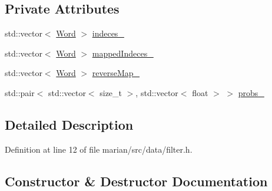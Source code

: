\subsection*{Private Attributes}
\begin{DoxyCompactItemize}
\item 
std\+::vector$<$ \hyperlink{namespacemarian_a5db8bee455c97a62d6a525dc48efe4c2}{Word} $>$ \hyperlink{classmarian_1_1FilterInfo_aa1adbd7e9344e1183b61db98c368ee66}{indeces\+\_\+}
\item 
std\+::vector$<$ \hyperlink{namespacemarian_a5db8bee455c97a62d6a525dc48efe4c2}{Word} $>$ \hyperlink{classmarian_1_1FilterInfo_a231ddfb90ed57402c6f20fa4e8eb3afd}{mapped\+Indeces\+\_\+}
\item 
std\+::vector$<$ \hyperlink{namespacemarian_a5db8bee455c97a62d6a525dc48efe4c2}{Word} $>$ \hyperlink{classmarian_1_1FilterInfo_a18e06a5f0cb4ae6ab7e1505a47c6f4a0}{reverse\+Map\+\_\+}
\item 
std\+::pair$<$ std\+::vector$<$ size\+\_\+t $>$, std\+::vector$<$ float $>$ $>$ \hyperlink{classmarian_1_1FilterInfo_a1050c89fb3c2ce4eaf2928979b20288d}{probs\+\_\+}
\end{DoxyCompactItemize}


\subsection{Detailed Description}


Definition at line 12 of file marian/src/data/filter.\+h.



\subsection{Constructor \& Destructor Documentation}
